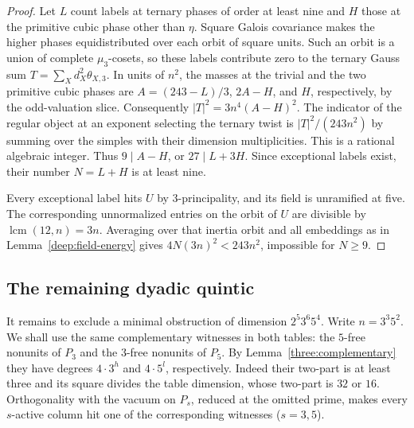 \documentclass[11pt,a4paper]{article}
\numberwithin{equation}{section}
\theoremstyle{remark}
\newcommand{\lcm}{\operatorname{lcm}}
\begin{document}
\begin{proof}
Let $L$ count labels at ternary phases of order at least nine
and $H$ those at the primitive cubic phase other than $\eta$.
Square Galois covariance makes the higher phases equidistributed
over each orbit of square units. Such an orbit is a union of
complete $\mu_3$-cosets, so these labels contribute zero to the
ternary Gauss sum $T=\sum_Xd_X^2\theta_{X,3}$.
In units of $n^2$, the masses at the trivial and the two primitive
cubic phases are $A=(243-L)/3$, $2A-H$, and $H$, respectively,
by the odd-valuation slice. Consequently
$|T|^2=3n^4(A-H)^2$. The indicator of the regular object at an
exponent selecting the ternary twist is $|T|^2/(243n^2)$
by summing \cite[Theorem~7.5]{NSfs} over the simples with their dimension multiplicities. This is a rational algebraic integer.
Thus $9\mid A-H$, or $27\mid L+3H$. Since exceptional labels
exist, their number $N=L+H$ is at least nine.

Every exceptional label hits $U$ by $3$-principality, and its
field is unramified at five. The corresponding unnormalized
entries on the orbit of $U$ are divisible by $\lcm(12,n)=3n$.
Averaging over that inertia orbit and all embeddings as in
Lemma~\ref{deep:field-energy} gives $4N(3n)^2<243n^2$, impossible
for $N\ge9$.
\end{proof}

\subsection{The remaining dyadic quintic}

It remains to exclude a minimal obstruction of dimension
$2^5 3^6 5^4$. Write $n=3^3 5^2$. We shall use the same
complementary witnesses in both tables: the $5$-free nonunits of
$P_3$ and the $3$-free nonunits of $P_5$. By
Lemma~\ref{three:complementary} they have degrees $4\cdot3^h$ and
$4\cdot5^l$, respectively. Indeed their two-part is at least three
and its square divides the table dimension, whose two-part is $32$
or $16$. Orthogonality with the vacuum on $P_s$, reduced at the
omitted prime, makes every $s$-active column hit one of the
corresponding witnesses ($s=3,5$).
\end{document}
